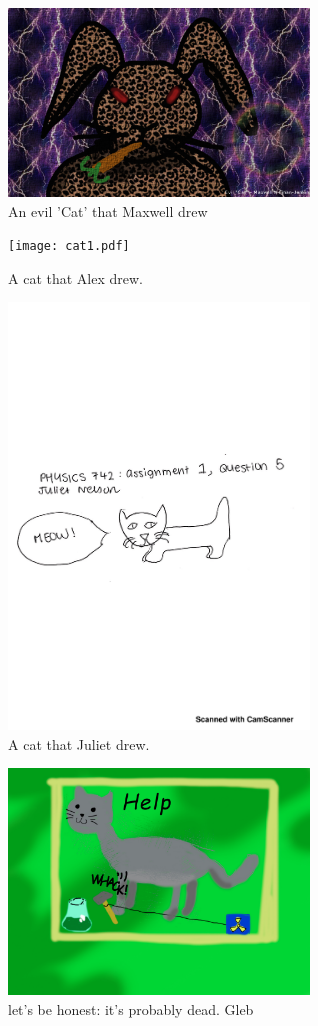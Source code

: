 \begin{centering}
\begin{figure}
	\includegraphics[width=8cm]{catto.pdf}
  \caption{An evil 'Cat' that Maxwell drew}
  \label{fig:catto}
\end{figure}



\begin{figure}
	\texttt{[image: cat1.pdf]}
  \caption{A cat that Alex drew.}
  \label{fig:cat_alex}
\end{figure}


\begin{figure}[H]
	\centering
	\includegraphics[width=8cm]{catjuliet.pdf}
	\caption{A cat that Juliet drew.}
	\label{fig:cat2}
\end{figure}



\begin{figure}
	\includegraphics[width=8cm]{cat-gleb.pdf}
  \caption{let's be honest: it's probably dead. Gleb }
  \label{fig:cat_gleb}
\end{figure}




\end{centering}
